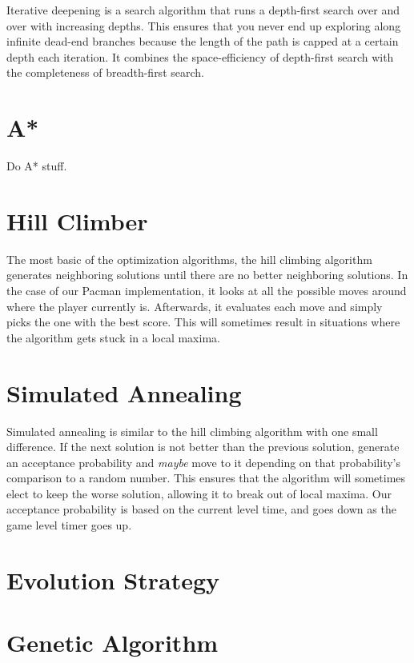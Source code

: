 \documentclass[a4paper,oneside,10pt]{report}
\begin{document}
Iterative deepening is a search algorithm that runs a depth-first search over and over with increasing depths. This ensures that you never end up exploring along infinite dead-end branches because the length of the path is capped at a certain depth each iteration. It combines the space-efficiency of depth-first search with the completeness of breadth-first search.

\section{A*}\label{astar}

Do A* stuff.

\section{Hill Climber}\label{hill}

The most basic of the optimization algorithms, the hill climbing algorithm generates neighboring solutions until there are no better neighboring solutions. In the case of our Pacman implementation, it looks at all the possible moves around where the player currently is. Afterwards, it evaluates each move and simply picks the one with the best score. This will sometimes result in situations where the algorithm gets stuck in a local maxima.

\section{Simulated Annealing}\label{sannealing}

Simulated annealing is similar to the hill climbing algorithm with one small difference. If the next solution is not better than the previous solution, generate an acceptance probability and \textit{maybe} move to it depending on that probability's comparison to a random number. This ensures that the algorithm will sometimes elect to keep the worse solution, allowing it to break out of local maxima. Our acceptance probability is based on the current level time, and goes down as the game level timer goes up. 

\section{Evolution Strategy}\label{evolution}

\section{Genetic Algorithm}\label{genetic}
\end{document}
